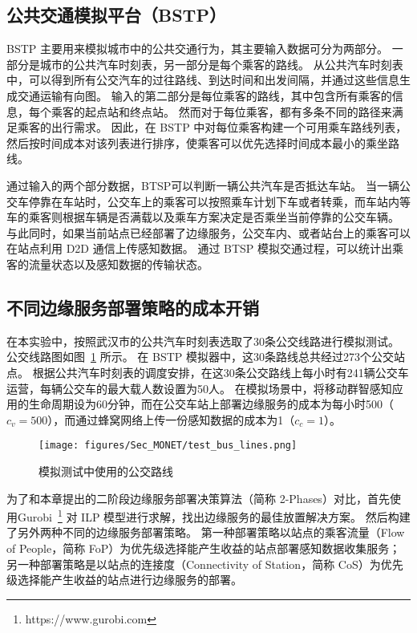 \subsection{公共交通模拟平台（BSTP）}

BSTP 主要用来模拟城市中的公共交通行为，其主要输入数据可分为两部分。
一部分是城市的公共汽车时刻表，另一部分是每个乘客的路线。
从公共汽车时刻表中，可以得到所有公交汽车的过往路线、到达时间和出发间隔，并通过这些信息生成交通运输有向图。
输入的第二部分是每位乘客的路线，其中包含所有乘客的信息，每个乘客的起点站和终点站。
然而对于每位乘客，都有多条不同的路径来满足乘客的出行需求。
因此，在 BSTP 中对每位乘客构建一个可用乘车路线列表，然后按时间成本对该列表进行排序，使乘客可以优先选择时间成本最小的乘坐路线。

通过输入的两个部分数据，BTSP可以判断一辆公共汽车是否抵达车站。
当一辆公交车停靠在车站时，公交车上的乘客可以按照乘车计划下车或者转乘，而车站内等车的乘客则根据车辆是否满载以及乘车方案决定是否乘坐当前停靠的公交车辆。
与此同时，如果当前站点已经部署了边缘服务，公交车内、或者站台上的乘客可以在站点利用 D2D 通信上传感知数据。
通过 BTSP 模拟交通过程，可以统计出乘客的流量状态以及感知数据的传输状态。

\subsection{不同边缘服务部署策略的成本开销}

在本实验中，按照武汉市的公共汽车时刻表选取了30条公交线路进行模拟测试。
公交线路图如图~\ref{Figure_test_bus_lines} 所示。
在 BSTP 模拟器中，这30条路线总共经过273个公交站点。
根据公共汽车时刻表的调度安排，在这30条公交路线上每小时有241辆公交车运营，每辆公交车的最大载人数设置为50人。
在模拟场景中，将移动群智感知应用的生命周期设为60分钟，而在公交车站上部署边缘服务的成本为每小时500（$c_v = 500$），而通过蜂窝网络上传一份感知数据的成本为1（$c_c = 1$）。

\begin{figure}[!h]
  \centering
  \texttt{[image: figures/Sec\_MONET/test\_bus\_lines.png]}
  \vspace{-0.5em}
  \caption{模拟测试中使用的公交路线}
  \label{Figure_test_bus_lines}
  \vspace{-1em}
\end{figure}

为了和本章提出的二阶段边缘服务部署决策算法（简称 2-Phases）对比，首先使用Gurobi~\footnote{https://www.gurobi.com} 对 ILP 模型进行求解，找出边缘服务的最佳放置解决方案。
然后构建了另外两种不同的边缘服务部署策略。
第一种部署策略以站点的乘客流量（Flow of People，简称 FoP）为优先级选择能产生收益的站点部署感知数据收集服务；
另一种部署策略是以站点的连接度（Connectivity of Station，简称 CoS）为优先级选择能产生收益的站点进行边缘服务的部署。

